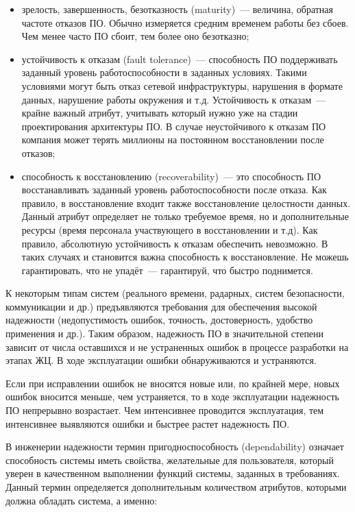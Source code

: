 \documentclass{../../text-style}
\begin{document}
\begin{itemize}
    \item зрелость, завершенность, безотказность (maturity)~--- величина, обратная частоте отказов ПО. Обычно измеряется средним временем работы без сбоев. Чем менее часто ПО сбоит, тем более оно безотказно;
    \item устойчивость к отказам (fault tolerance)~--- способность ПО поддерживать заданный уровень работоспособности в заданных условиях. Такими условиями могут быть отказ сетевой инфраструктуры, нарушения в формате данных, нарушение работы окружения и т.д. Устойчивость к отказам~--- крайне важный атрибут, учитывать который нужно уже на стадии проектирования архитектуры ПО. В случае неустойчивого к отказам ПО компания может терять миллионы на постоянном восстановлении после отказов;
    \item способность к восстановлению (recoverability)~--- это способность ПО восстанавливать заданный уровень работоспособности после отказа. Как правило, в восстановление входит также восстановление целостности данных. Данный атрибут определяет не только требуемое время, но и дополнительные ресурсы (время персонала участвующего в восстановлении и т.д). Как правило, абсолютную устойчивость к отказам обеспечить невозможно. В таких случаях и становится важна способность к восстановление. Не можешь гарантировать, что не упадёт~--- гарантируй, что быстро поднимется.
\end{itemize}

К некоторым типам систем (реального времени, радарных, систем безопасности, коммуникации и др.) предъявляются требования для обеспечения высокой надежности (недопустимость ошибок, точность, достоверность, удобство применения и др.). Таким образом, надежность ПО в значительной степени зависит от числа оставшихся и не устраненных ошибок в процессе разработки на этапах ЖЦ. В ходе эксплуатации ошибки обнаруживаются и устраняются.

Если при исправлении ошибок не вносятся новые или, по крайней мере, новых ошибок вносится меньше, чем устраняется, то в ходе эксплуатации надежность ПО непрерывно возрастает. Чем интенсивнее проводится эксплуатация, тем интенсивнее выявляются ошибки и быстрее растет надежность ПО.

В инженерии надежности термин пригодноспособность (dependability) означает способность системы иметь свойства, желательные для пользователя, который уверен в качественном выполнении функций системы, заданных в требованиях. Данный термин определяется дополнительным количеством атрибутов, которыми должна обладать система, а именно:
\end{document}
